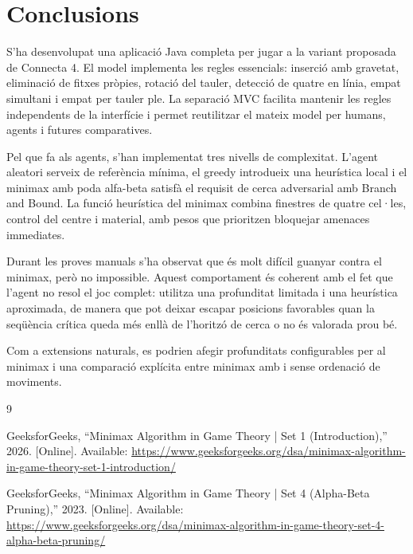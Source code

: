 \documentclass[conference,compsoc]{IEEEtran}
\begin{document}
\section{Conclusions}

S'ha desenvolupat una aplicació Java completa per jugar a la variant proposada de
Connecta 4. El model implementa les regles essencials: inserció amb gravetat,
eliminació de fitxes pròpies, rotació del tauler, detecció de quatre en línia,
empat simultani i empat per tauler ple. La separació MVC facilita mantenir les
regles independents de la interfície i permet reutilitzar el mateix model per
humans, agents i futures comparatives.

Pel que fa als agents, s'han implementat tres nivells de complexitat. L'agent
aleatori serveix de referència mínima, el greedy introdueix una heurística local i
el minimax amb poda alfa-beta satisfà el requisit de cerca adversarial amb Branch
and Bound. La funció heurística del minimax combina finestres de quatre cel·les,
control del centre i material, amb pesos que prioritzen bloquejar amenaces
immediates.

Durant les proves manuals s'ha observat que és molt difícil guanyar contra el
minimax, però no impossible. Aquest comportament és coherent amb el fet que
l'agent no resol el joc complet: utilitza una profunditat limitada i una heurística
aproximada, de manera que pot deixar escapar posicions favorables quan la seqüència
crítica queda més enllà de l'horitzó de cerca o no és valorada prou bé.

Com a extensions naturals, es podrien afegir profunditats configurables per al
minimax i una comparació explícita entre minimax amb i sense ordenació de
moviments.

\begin{thebibliography}{9}

GeeksforGeeks, ``Minimax Algorithm in Game Theory | Set 1 (Introduction),''
2026. [Online]. Available:
\url{https://www.geeksforgeeks.org/dsa/minimax-algorithm-in-game-theory-set-1-introduction/}

GeeksforGeeks, ``Minimax Algorithm in Game Theory | Set 4 (Alpha-Beta
Pruning),'' 2023. [Online]. Available:
\url{https://www.geeksforgeeks.org/dsa/minimax-algorithm-in-game-theory-set-4-alpha-beta-pruning/}

\end{thebibliography}
\end{document}
